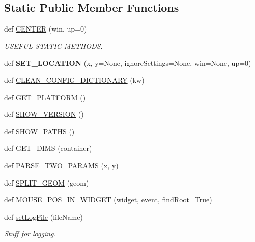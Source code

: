 \subsection*{Static Public Member Functions}
\begin{DoxyCompactItemize}
\item 
\mbox{\label{classappjar_1_1gui_a9b4adf10f4b19fbdcb18c2d9934c00d3}} 
def \hyperlink{classappjar_1_1gui_a9b4adf10f4b19fbdcb18c2d9934c00d3}{C\+E\+N\+T\+ER} (win, up=0)
\begin{DoxyCompactList}\small\item\em U\+S\+E\+F\+UL S\+T\+A\+T\+IC M\+E\+T\+H\+O\+DS. \end{DoxyCompactList}\item 
\mbox{\label{classappjar_1_1gui_ae233e5e0e91a8639bc2014e854475ec9}} 
def {\bfseries S\+E\+T\+\_\+\+L\+O\+C\+A\+T\+I\+ON} (x, y=None, ignore\+Settings=None, win=None, up=0)
\item 
def \hyperlink{classappjar_1_1gui_a74da0ca1b7e1ca41669c8a4f6e526aa5}{C\+L\+E\+A\+N\+\_\+\+C\+O\+N\+F\+I\+G\+\_\+\+D\+I\+C\+T\+I\+O\+N\+A\+RY} (kw)
\item 
def \hyperlink{classappjar_1_1gui_a881a81f3d01fcf73cc17ad48317eee12}{G\+E\+T\+\_\+\+P\+L\+A\+T\+F\+O\+RM} ()
\item 
def \hyperlink{classappjar_1_1gui_aba9d46c077f5d1a77aafbf0721410c54}{S\+H\+O\+W\+\_\+\+V\+E\+R\+S\+I\+ON} ()
\item 
def \hyperlink{classappjar_1_1gui_a51486c34591da1e3da5732d2b59467c1}{S\+H\+O\+W\+\_\+\+P\+A\+T\+HS} ()
\item 
def \hyperlink{classappjar_1_1gui_a3a4fac9114cd9cbc969525514abad562}{G\+E\+T\+\_\+\+D\+I\+MS} (container)
\item 
def \hyperlink{classappjar_1_1gui_a939ff1df33b313c7c1c1810c4901b927}{P\+A\+R\+S\+E\+\_\+\+T\+W\+O\+\_\+\+P\+A\+R\+A\+MS} (x, y)
\item 
def \hyperlink{classappjar_1_1gui_a13b2067ca27ab714ae2a9f53c266f2b3}{S\+P\+L\+I\+T\+\_\+\+G\+E\+OM} (geom)
\item 
def \hyperlink{classappjar_1_1gui_a78f91618f79934dce10c51c83d18d9b7}{M\+O\+U\+S\+E\+\_\+\+P\+O\+S\+\_\+\+I\+N\+\_\+\+W\+I\+D\+G\+ET} (widget, event, find\+Root=True)
\item 
def \hyperlink{classappjar_1_1gui_ae007726ee968ef08e88cbe0f30f8721f}{set\+Log\+File} (file\+Name)
\begin{DoxyCompactList}\small\item\em Stuff for logging. \end{DoxyCompactList}\item 

\end{DoxyCompactItemize}

